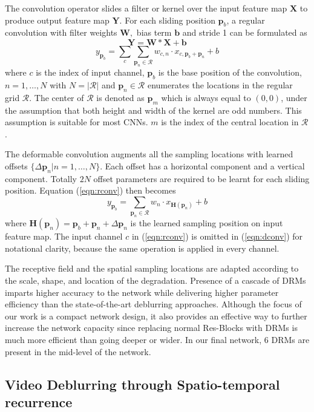 \documentclass[10pt,twocolumn,letterpaper]{article}
\newcommand{\vecpn}{{\mathbf{p}_n}}
\newcommand{\vecpb}{{\mathbf{p}_b}}
\newcommand{\vecpm}{{\mathbf{p}_m}}
\begin{document}
The convolution operator slides a filter or kernel over the input feature map $\mathbf{X}$ to produce output feature map $\mathbf{Y.}$ For each sliding position $\vecpb$, a regular convolution with filter weights $\mathbf{W},$ bias term $\mathbf{b}$ and stride 1 can be formulated as
$$\mathbf{Y}=\mathbf{W}*\mathbf{X}+\mathbf{b}$$
\begin{equation}
\label{eqn:rconv}
y_\vecpb=\sum_c{\sum_{\vecpn\in\mathcal{R}}{w_{c,n}\cdot x_{c,\vecpb+\vecpn}+b}}
\end{equation}
where $c$ is the index of input channel, $\vecpb$ is the base position of the convolution, $n=1,\ldots,N$ with $N=|{\mathcal{R}|}$ and $\vecpn\in\mathcal{R}$ enumerates the locations in the regular grid $\mathcal{R}$. The center of $\mathcal{R}$ is denoted as $\vecpm$ which is always equal to $(0,0)$, under the assumption that both height and width of the kernel are odd numbers. This assumption is suitable for most CNNs. $m$ is the index of the central location in $\mathcal{R}$.

The deformable convolution augments all the sampling locations with learned offsets $\{\Delta\mathbf{p}_n|n=1,\ldots,N\}$. Each offset has a horizontal component and a vertical component. Totally $2N$ offset parameters are required to be learnt for each sliding position. Equation (\ref{eqn:rconv}) then becomes
\begin{equation}
\label{eqn:dconv}
y_\vecpb=\sum_{\vecpn\in\mathcal{R}}{w_n\cdot x_{\mathbf{H}(\vecpn)}+b}
\end{equation}
where $\mathbf{H}(\vecpn)=\vecpb+\vecpn+\Delta\vecpn$ is the learned sampling position on input feature map. The input channel $c$ in (\ref{eqn:rconv}) is omitted in (\ref{eqn:dconv}) for notational clarity, because the same operation is applied in every channel.


The receptive field and the spatial sampling locations are adapted according to the scale, shape, and location of the degradation. Presence of a cascade of DRMs imparts higher accuracy to the network while delivering higher parameter efficiency than the state-of-the-art deblurring approaches. Although the focus of our work is a compact network design, it also provides an effective way to further increase the network capacity since replacing normal Res-Blocks with DRMs is much more efficient than going deeper or wider. In our final network, $6$ DRMs are present in the mid-level of the network.

 
 \subsection{Video Deblurring through Spatio-temporal recurrence}
\end{document}
